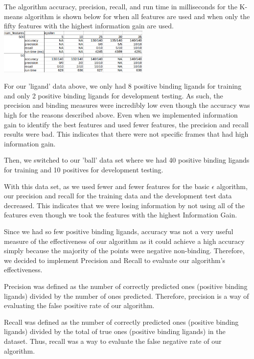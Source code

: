 \documentclass[11pt,letterpaper]{article}
\begin{document}
The algorithm accuracy, precision, recall, and run time in milliseconds for the K-means algorithm is shown below for when all features are used and when only the fifty features with the highest information gain are used. \\

\includegraphics[width=75mm]{kMeansData.png}

For our 'ligand' data above, we only had 8 positive binding ligands for training and only 2 positive binding ligands for development testing.  As such, the precision and binding measures were incredibly low even though the accuracy was high for the reasons described above.  Even when we implemented information gain to identify the best features and used fewer features, the precision and recall results were bad.  This indicates that there were not specific frames that had high information gain.  

Then, we switched to our 'ball' data set where we had 40 positive binding ligands for training and 10 positives for development testing.

With this data set, as we used fewer and fewer features for the basic $\epsilon$ algorithm, our precision and recall for the training data and the development test data decreased.  This indicates that we were losing information by not using all of the features even though we took the features with the highest Information Gain.


Since we had so few positive binding ligands, accuracy was not a very useful measure of the effectiveness of our algorithm as it could achieve a high accuracy simply because the majority of the points were negative non-binding.  Therefore, we decided to implement Precision and Recall to evaluate our algorithm's effectiveness.

Precision was defined as the number of correctly predicted ones (positive binding ligands) divided by the number of ones predicted.  Therefore, precision is a way of evaluating the false positive rate of our algorithm.

Recall was defined as the number of correctly predicted ones (positive binding ligands) divided by the total of true ones (positive binding ligands) in the dataset.  Thus, recall was a way to evaluate the false negative rate of our algorithm.
\end{document}
